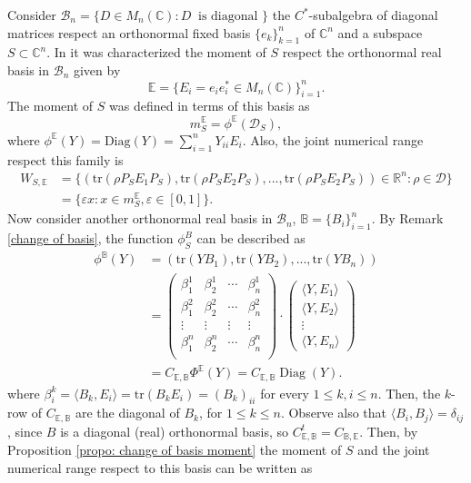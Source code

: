\documentclass[12pt,a4paper]{article}
\def\R{\mathbb R}
\def\C{\mathbb C}
\DeclareMathOperator{\Diag}{Diag}
\def\tr{\text{tr}}
\numberwithin{equation}{section}
\begin{document}
Consider $\mathcal{B}_n= \{D\in M_n(\C): D\ \text{ is diagonal }\}$ the $C^*$-subalgebra of diagonal matrices respect an orthonormal fixed basis $\{e_k\}_{k=1}^n$ of $\C^n$ and a subspace $S\subset \C^n$. 
In \cite{KV moment} it was characterized the moment of $S$ respect  the orthonormal real basis in $\mathcal{B}_n$ given by
\begin{equation}
	\mathbb{E}=\{E_i= e_ie_i^*\in M_n(\C)\}_{i=1}^n.
\end{equation}
The moment of $S$ was defined in terms of this basis as
\begin{equation}
	m_S^{\mathbb{E}}= \phi^{\mathbb{E}}(\mathcal{D}_S),
\end{equation}
where $\phi^{\mathbb{E}}(Y)=\text{Diag}(Y)=\sum_{i=1}^{n}Y_{ii}E_i$. Also, the joint numerical range respect this family is
\begin{align*}
	W_{S,\mathbb{E}}&=\{(\tr(\rho P_SE_1P_S), \tr(\rho P_SE_2P_S),...,\tr(\rho P_SE_2P_S))\in \R^n: \rho \in \mathcal{D}\}\\
	&= \{\varepsilon x: x\in m_S^{\mathbb{E}}, \varepsilon\in[0,1]\}.
\end{align*}
Now consider another orthonormal real basis in $\mathcal{B}_n$, $\mathbb{B}=\{B_i\}_{i=1}^n$. By Remark \ref{change of basis}, the function $\phi_S^B$ can be described as
\begin{align*}
	\phi^{\mathbb{B}}(Y)&= (\tr(YB_1), \tr(YB_2),...,\tr(YB_n))\\
	& =\begin{pmatrix}
		\beta_1^1&\beta_2^1&\cdots&\beta_{n}^1\\
		\beta_1^2&\beta_2^2&\cdots&\beta_{n}^2\\
		\vdots&\vdots&\vdots&\vdots\\
		\beta_1^{n}&\beta_2^{n}&\cdots&\beta_{n}^{n}\\
	\end{pmatrix}\cdot\begin{pmatrix}
		\langle Y,  E_1\rangle\\
		\langle Y,  E_2\rangle\\
		\vdots\\
		\langle Y,  E_n\rangle		
	\end{pmatrix}\\
	&= C_{\mathbb{E},\mathbb{B}}\Phi^{\mathbb{E}}(Y)= C_{\mathbb{E},\mathbb{B}}\Diag(Y).	
\end{align*} 
where $\beta_i^k=\langle B_k,E_i\rangle=\tr(B_kE_i)= (B_k)_{ii}$ for every $1\leq k,i\leq n$. Then, the $k$-row of $C_{\mathbb{E},\mathbb{B}}$ are the diagonal of $B_k$, for $1\leq k\leq n$. Observe also that $\langle B_i,B_j\rangle=\delta_{ij}$, since $B$ is a diagonal (real) orthonormal basis, so $ C_{\mathbb{E},\mathbb{B}}^t=C_{\mathbb{B},\mathbb{E}}$. Then, by Proposition \ref{propo: change of basis moment} the moment of $S$ and the joint numerical range respect to this basis can be written as
\end{document}
